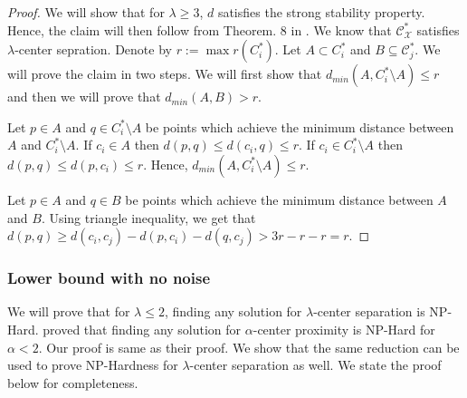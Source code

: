 \documentclass[anon,12pt]{colt2016} %
\newcommand{\mc}{\mathcal}
\begin{document}
\begin{proof}
We will show that for $\lambda \ge 3$, $d$ satisfies the strong stability property. Hence, the claim will then follow from Theorem. 8 in \cite{balcan2008discriminative}. We know that $\mc C_{\mc X}^*$ satisfies $\lambda$-center sepration. Denote by $r := \max r(C_i^*)$. Let $A \subset C_i^*$ and $B \subseteq \mc C_j^*$. We will prove the claim in two steps. We will first show that $d_{min}(A, C_i^*\setminus A) \le r$ and then we will prove that $d_{min}(A, B) > r$.

Let $p \in A$ and $q \in C_i^* \setminus A$ be points which achieve the minimum distance between $A$ and $C_i^*\setminus A$. If $c_i \in A$ then $d(p, q) \le d(c_i, q) \le r$. If $c_i \in C_i^* \setminus A$ then $d(p, q) \le d(p, c_i) \le r$. Hence, $d_{min} (A, C_i^*\setminus A) \le r$.

Let $p \in A$ and $q \in B$ be points which achieve the minimum distance between $A$ and $B$. Using triangle inequality, we get that $d(p, q) \ge d(c_i, c_j) - d(p, c_i) - d(q, c_j) > 3r - r - r = r$.
\end{proof}

\subsubsection{Lower bound with no noise}
We will prove that for $\lambda \le 2$, finding any solution for $\lambda$-center separation is NP-Hard. \cite{reyzin2012data} proved that finding any solution for $\alpha$-center proximity is NP-Hard for $\alpha < 2$. Our proof is same as their proof. We show that the same reduction can be used to prove NP-Hardness for $\lambda$-center separation as well. We state the proof below for completeness.
\end{document}
